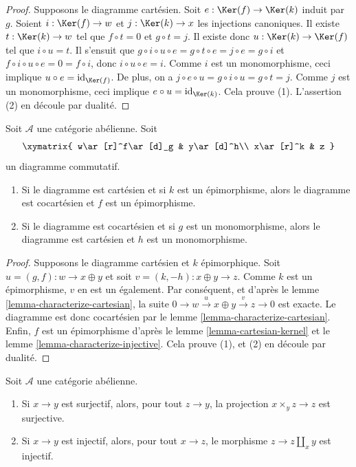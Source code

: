 \begin{proof}
Supposons le diagramme cartésien. Soit 
$e:\Ker(f)\to\Ker(k)$ induit par $g$. Soient 
$i:\Ker(f)\to w$ et $j:\Ker(k)\to x$ les injections 
canoniques. Il existe $t:\Ker(k)\to w$ tel que $f\circ t=0$ 
et $g\circ t=j$. Il existe donc $u:\Ker(k)\to\Ker(f)$ 
tel que $i\circ u=t$. Il s'ensuit que 
$g\circ i\circ u\circ e=g\circ t\circ e=j\circ e=g\circ i$ et 
$f\circ i\circ u\circ e=0=f\circ i$, donc $i\circ u\circ e=i$. Comme 
$i$ est un monomorphisme, ceci implique $u\circ e=\text{id}_{\Ker(f)}$.
De plus, on a $j\circ e\circ u=g\circ i\circ u=g\circ t=j$. 
Comme $j$ est un monomorphisme, ceci implique $e\circ u=\text{id}_{\Ker(k)}$.
Cela prouve (1). L'assertion (2) en découle par dualité.
\end{proof}

\begin{lemma}
\label{lemma-cartesian-cocartesian}
Soit $\mathcal{A}$ une catégorie abélienne. Soit
$$
\xymatrix{
w\ar[r]^f\ar[d]_g
& y\ar[d]^h\\
x\ar[r]^k
& z
}
$$
un diagramme commutatif.
\begin{enumerate}
\item Si le diagramme est cartésien et si $k$ est un épimorphisme, 
alors le diagramme est cocartésien et $f$ est un épimorphisme.
\item Si le diagramme est cocartésien et si $g$ est un monomorphisme, 
alors le diagramme est cartésien et $h$ est un monomorphisme.
\end{enumerate}
\end{lemma}

\begin{proof}
Supposons le diagramme cartésien et $k$ épimorphique. 
Soit $u = (g, f) : w \to x \oplus y$ et soit $v = (k, -h) : x \oplus y \to z$. 
Comme $k$ est un épimorphisme, $v$ en est un également. Par conséquent, 
et d'après le lemme \ref{lemma-characterize-cartesian}, la suite 
$0\to w\overset{u}\to x\oplus y\overset{v}\to z\to 0$ est exacte. Le 
diagramme est donc cocartésien par le lemme \ref{lemma-characterize-cartesian}. Enfin, 
$f$ est un épimorphisme d'après le lemme \ref{lemma-cartesian-kernel} et le 
lemme \ref{lemma-characterize-injective}. Cela prouve (1), et (2) 
en découle par dualité.
\end{proof}

\begin{lemma}
\label{lemma-epimorphism-universal-abelian-category}
Soit $\mathcal{A}$ une catégorie abélienne.
\begin{enumerate}
\item Si $x \to y$ est surjectif, alors, pour tout $z \to y$, la
projection $x \times_y z \to z$ est surjective.
\item Si $x \to y$ est injectif, alors, pour tout $x \to z$, le
morphisme $z \to z \amalg_x y$ est injectif.
\end{enumerate}
\end{lemma}

